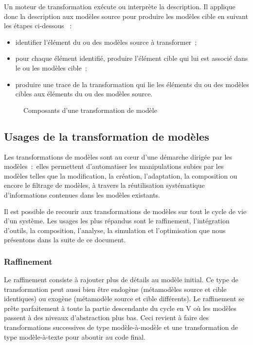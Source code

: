 Un moteur de transformation exécute ou interprète la description. Il applique 
donc la description aux modèles source pour produire les modèles cible en 
suivant les étapes ci-dessous \cite{tratt2005model}~:

\begin{itemize}
\item identifier l'élément du ou des modèles source à transformer~;
\item pour chaque élément identifié, produire l'élément cible qui lui est 
associé dans le ou les modèles cible~;
\item produire une trace de la transformation qui lie les éléments du ou des 
modèles cibles aux éléments du ou des modèles source.
\end{itemize}

\begin{figure}[!ht]
    \begin{center}
        
    \end{center}
    \caption{Composants d'une transformation de modèle}
    \label{fig:composantTransfo}
\end{figure}

\subsection{Usages de la transformation de modèles }
Les transformations de modèles sont au cœur d'une démarche dirigée par les 
modèles~:~elles permettent d'automatiser les manipulations subies par les 
modèles telles que la modification, la création, l'adaptation, la composition ou 
encore le filtrage de modèles, à travers la réutilisation systématique 
d'informations contenues dans les modèles existants. 

Il est possible de recourir aux transformations de modèles sur tout le cycle de 
vie d'un système. Les usages les plus répandus sont le raffinement, 
l'intégration d'outils, la composition, l'analyse, la simulation et 
l'optimisation que nous présentons dans la suite de ce document. 


\subsubsection{Raffinement}

Le raffinement consiste à rajouter plus de détails au modèle initial. Ce type de 
transformation peut aussi bien être endogène (métamodèles source et cible 
identiques) ou exogène (métamodèle source et cible différents). Le raffinement se 
prête parfaitement à toute la partie descendante du cycle en V où les modèles 
passent à des niveaux d'abstraction plus bas. Ceci revient à faire des 
transformations successives de type modèle-à-modèle et une transformation de 
type modèle-à-texte pour aboutir au code final.


